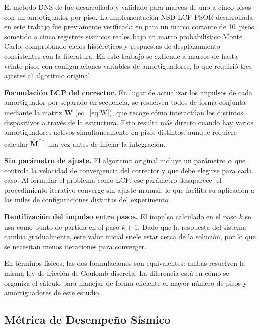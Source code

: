\documentclass[preprint,12pt,authoryear]{elsarticle}
\begin{document}
El método DNS de \citet{Namorado2024} fue desarrollado y validado para marcos
de uno a cinco pisos con un amortiguador por piso. La implementación
NSD-LCP-PSOR desarrollada en este trabajo fue previamente verificada en
\citet{Ponce2026} para un marco cortante de 10~pisos sometido a cinco registros
sísmicos reales bajo un marco probabilístico Monte Carlo, comprobando ciclos
histéreticos y respuestas de desplazamiento consistentes con la literatura. En
este trabajo se extiende a marcos de hasta veinte pisos con configuraciones
variables de amortiguadores, lo que requirió tres ajustes al algoritmo original.

\textbf{Formulación LCP del corrector.}
En lugar de actualizar los impulsos de cada amortiguador por separado en
secuencia, se resuelven todos de forma conjunta mediante la matriz $\bm{W}$
(ec.~\ref{eq:W}), que recoge cómo interactúan los distintos dispositivos a
través de la estructura. Esto resulta más directo cuando hay varios
amortiguadores activos simultáneamente en pisos distintos, aunque requiere
calcular $\hat{\bm{M}}^{-1}$ una vez antes de iniciar la integración.

\textbf{Sin parámetro de ajuste.}
El algoritmo original incluye un parámetro $\alpha$ que controla la velocidad
de convergencia del corrector y que debe elegirse para cada caso. Al formular
el problema como LCP, ese parámetro desaparece: el procedimiento iterativo
converge sin ajuste manual, lo que facilita su aplicación a las miles de
configuraciones distintas del experimento.

\textbf{Reutilización del impulso entre pasos.}
El impulso calculado en el paso $k$ se usa como punto de partida en el paso
$k+1$. Dado que la respuesta del sistema cambia gradualmente, este valor
inicial suele estar cerca de la solución, por lo que se necesitan menos
iteraciones para converger.

En términos físicos, las dos formulaciones son equivalentes: ambas resuelven
la misma ley de fricción de Coulomb discreta. La diferencia está en cómo se
organiza el cálculo para manejar de forma eficiente el mayor número de pisos
y amortiguadores de este estudio.

\subsection{Métrica de Desempeño Sísmico}
\label{sec:theory:metrica}
\end{document}
